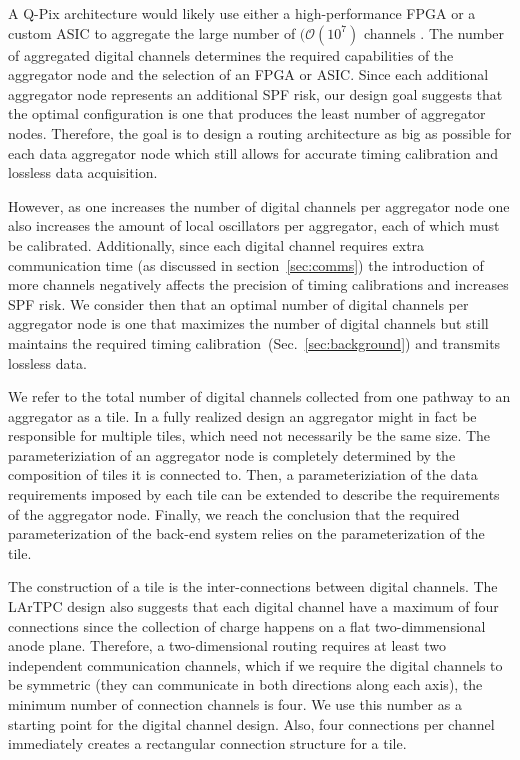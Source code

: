 A Q-Pix architecture would likely use either a high-performance FPGA or a custom ASIC to aggregate the large number of $(\mathcal{O}(10^{7})$ channels .
The number of aggregated digital channels determines the required capabilities of the aggregator node and the selection of an FPGA or ASIC.
Since each additional aggregator node represents an additional SPF risk, our design goal suggests that the optimal configuration is one that produces the least number of aggregator nodes.
Therefore, the goal is to design a routing architecture as big as possible for each data aggregator node which still allows for accurate timing calibration and lossless data acquisition.

However, as one increases the number of digital channels per aggregator node one also increases the amount of local oscillators per aggregator, each of which must be calibrated.
Additionally, since each digital channel requires extra communication time (as discussed in section~\ref{sec:comms}) the introduction of more channels negatively affects the precision of timing calibrations and increases SPF risk.
We consider then that an optimal number of digital channels per aggregator node is one that maximizes the number of digital channels but still maintains the required timing calibration~(Sec.~\ref{sec:background}) and transmits lossless data.

We refer to the total number of digital channels collected from one pathway to an aggregator as a tile.
In a fully realized design an aggregator might in fact be responsible for multiple tiles, which need not necessarily be the same size.
The parameteriziation of an aggregator node is completely determined by the composition of tiles it is connected to.
Then, a parameteriziation of the data requirements imposed by each tile can be extended to describe the requirements of the aggregator node.
Finally, we reach the conclusion that the required parameterization of the back-end system relies on the parameterization of the tile.

The construction of a tile is the inter-connections between digital channels.
The LArTPC design also suggests that each digital channel have a maximum of four connections since the collection of charge happens on a flat two-dimmensional anode plane.
Therefore, a two-dimensional routing requires at least two independent communication channels, which if we require the digital channels to be symmetric (they can communicate in both directions along each axis), the minimum number of connection channels is four.
We use this number as a starting point for the digital channel design.
Also, four connections per channel immediately creates a rectangular connection structure for a tile.

